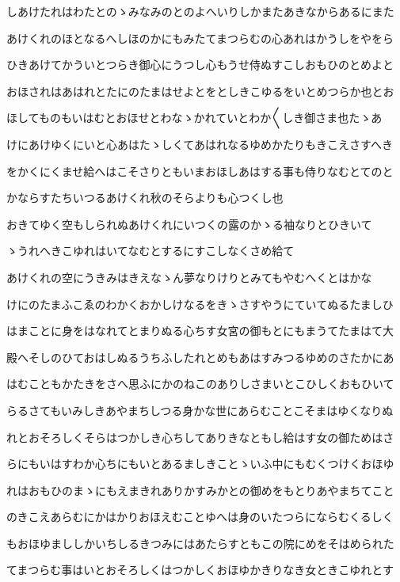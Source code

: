 \documentclass[a4paper,11pt,landscape]{ltjtarticle}
\begin{document}
しあけたれはわたとのゝみなみのとのよへいりしかまたあきなからあるにまた
\par\medskip
あけくれのほとなるへしほのかにもみたてまつらむの心あれはかうしをやをら
\par\medskip
ひきあけてかういとつらき御心にうつし心もうせ侍ぬすこしおもひのとめよと
\par\medskip
おほされはあはれとたにのたまはせよとをとしきこゆるをいとめつらか也とお
\par\medskip
ほしてものもいはむとおほせとわなゝかれていとわか〱しき御さま也たゝあ
\par\medskip
けにあけゆくにいと心あはたゝしくてあはれなるゆめかたりもきこえさすへき
\par\medskip
をかくにくませ給へはこそさりともいまおほしあはする事も侍りなむとてのと
\par\medskip
かならすたちいつるあけくれ秋のそらよりも心つくし也
\par\medskip
おきてゆく空もしられぬあけくれにいつくの露のかゝる袖なりとひきいて
\par\medskip
ゝうれへきこゆれはいてなむとするにすこしなくさめ給て
\par\medskip
あけくれの空にうきみはきえなゝん夢なりけりとみてもやむへくとはかな
\par\medskip
けにのたまふこゑのわかくおかしけなるをきゝさすやうにていてぬるたましひ
\par\medskip
はまことに身をはなれてとまりぬる心ちす女宮の御もとにもまうてたまはて大
\par\medskip
殿へそしのひておはしぬるうちふしたれとめもあはすみつるゆめのさたかにあ
\par\medskip
はむこともかたきをさへ思ふにかのねこのありしさまいとこひしくおもひいて
\par\medskip
らるさてもいみしきあやまちしつる身かな世にあらむことこそまはゆくなりぬ
\par\medskip
れとおそろしくそらはつかしき心ちしてありきなともし給はす女の御ためはさ
\par\medskip
らにもいはすわか心ちにもいとあるましきことゝいふ中にもむくつけくおほゆ
\par\medskip
れはおもひのまゝにもえまきれありかすみかとの御めをもとりあやまちてこと
\par\medskip
のきこえあらむにかはかりおほえむことゆへは身のいたつらにならむくるしく
\par\medskip
もおほゆまししかいちしるきつみにはあたらすともこの院にめをそはめられた
\par\medskip
てまつらむ事はいとおそろしくはつかしくおほゆかきりなき女ときこゆれとす
\end{document}

